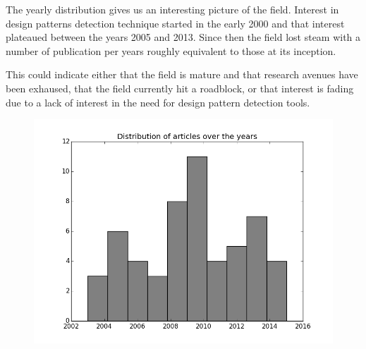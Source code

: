 \documentclass[letterpaper, 10 pt, conference]{ieeeconf}  %
\begin{document}
The yearly distribution gives us an interesting picture of the field.
Interest in design patterns detection technique started in the early
2000 and that interest plateaued between the years 2005 and 2013.
Since then the field lost steam with a number of publication per years
roughly equivalent to those at its inception.

This could indicate either that the field is mature and that research avenues
have been exhaused, that the field currently hit a roadblock, or that interest
is fading due to a lack of interest in the need for design pattern detection
tools.

\begin{figure}
  \centering
  \includegraphics[scale=0.450]{year_distribution.png}
  \caption{}
\end{figure}
\end{document}
